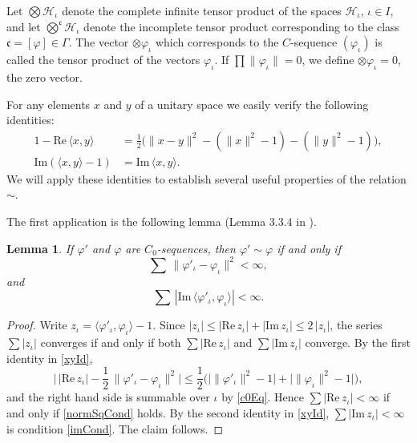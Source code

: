 \documentclass[twoside,11pt,letter]{article}
\def\cH{{\mathcal{H}}}
\def\fc{{\mathfrak{c}}}
\def\im{\mathrm{Im}}
\def\re{\mathrm{Re}}
\theoremstyle{definition}
\theoremstyle{definition}
\theoremstyle{plain}
\newtheorem{lemma}[theorem]{Lemma}
\begin{document}
Let $\bigotimes\cH_\iota$ denote the complete infinite tensor product of the spaces $\cH_\iota$, $\iota\in I$, and let $\bigotimes^\fc\cH_\iota$ denote the incomplete tensor product corresponding to the class $\fc=[\varphi]\in\Gamma$. The vector $\otimes\varphi_\iota$ which corresponds to the $C$-sequence $(\varphi_\iota)$ is called the tensor product of the vectors $\varphi_\iota$. If $\prod\|\varphi_\iota\|=0$, we define $\otimes\varphi_\iota=0$, the zero vector.

For any elements $x$ and $y$ of a unitary space we easily verify the following identities:
\begin{equation}
\begin{split}\label{xyId}
1-\re\,\langle x,y\rangle&=\frac12\big(\|x-y\|^2-(\|x\|^2-1)-(\|y\|^2-1)\big),\\
\im(\langle x,y\rangle-1)&=\im\,\langle x,y\rangle.
\end{split}
\end{equation}
We will apply these identities to establish several useful properties of the relation $\sim$.

The first application is the following lemma (Lemma 3.3.4 in \cite{vN39}).
\begin{lemma}\label{vN334}
If $\varphi'$ and $\varphi$ are $C_0$-sequences, then $\varphi'\sim\varphi$ if and only if
\begin{equation}\label{normSqCond}
\sum\,\|\varphi'_\iota-\varphi_\iota\|^2<\infty,
\end{equation}
and
\begin{equation}\label{imCond}
\sum\,|\im\,\langle\varphi'_\iota,\varphi_\iota\rangle|<\infty.
\end{equation}
\end{lemma}
\begin{proof}
Write $z_\iota=\langle\varphi'_\iota,\varphi_\iota\rangle-1$. Since $|z_\iota|\leq|\re\, z_\iota|+|\im\, z_\iota|\leq 2\,|z_\iota|$, the series $\sum|z_\iota|$ converges if and only if both $\sum|\re\, z_\iota|$ and $\sum|\im\, z_\iota|$ converge. By the first identity in \eqref{xyId},
\begin{equation*}
\Big|\,|\re\, z_\iota|-\frac12\,\|\varphi'_\iota-\varphi_\iota\|^2\Big|\leq\frac12\Big(\big|\|\varphi'_\iota\|^2-1\big|+\big|\|\varphi_\iota\|^2-1\big|\Big),
\end{equation*}
and the right hand side is summable over $\iota$ by \eqref{c0Eq}. Hence $\sum|\re\, z_\iota|<\infty$ if and only if \eqref{normSqCond} holds. By the second identity in \eqref{xyId}, $\sum|\im\, z_\iota|<\infty$ is condition \eqref{imCond}. The claim follows.
\end{proof}
\end{document}

